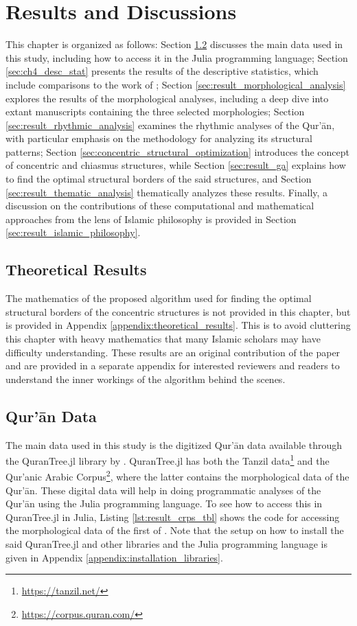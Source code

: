 \chapter{Results and Discussions}\label{ch:results}
This chapter is organized as follows: Section \ref{sec:result_data} discusses the main data used in this study, including how to access it in the Julia programming language; Section \ref{sec:ch4_desc_stat} presents the results of the descriptive statistics, which include comparisons to the work of \cite{sinai2020oqs}; Section \ref{sec:result_morphological_analysis} explores the results of the morphological analyses, including a deep dive into extant manuscripts containing the three selected morphologies; Section \ref{sec:result_rhythmic_analysis} examines the rhythmic analyses of the Qur'\=an, with particular emphasis on the methodology for analyzing its structural patterns; Section \ref{sec:concentric_structural_optimization} introduces the concept of concentric and chiasmus structures, while Section \ref{sec:result_ga} explains how to find the optimal structural borders of the said structures, and Section \ref{sec:result_thematic_analysis} thematically analyzes these results. Finally, a discussion on the contributions of these computational and mathematical approaches from the lens of Islamic philosophy is provided in Section \ref{sec:result_islamic_philosophy}.
\section{Theoretical Results}
The mathematics of the proposed algorithm used for finding the optimal structural borders of the concentric structures is not provided in this chapter, but is provided in Appendix \ref{appendix:theoretical_results}. This is to avoid cluttering this chapter with heavy mathematics that many Islamic scholars may have difficulty understanding. These results are an original contribution of the paper and are provided in a separate appendix for interested reviewers and readers to understand the inner workings of the algorithm behind the scenes.
\section{Qur'\=an Data}\label{sec:result_data}
The main data used in this study is the digitized Qur'\=an data available through the QuranTree.jl library by . QuranTree.jl has both the Tanzil data\footnote{\url{https://tanzil.net/}} and the Qur'anic Arabic Corpus\footnote{\url{https://corpus.quran.com/}}, where the latter contains the morphological data of the Qur'\=an. These digital data will help in doing programmatic analyses of the Qur'\=an using the Julia programming language. To see how to access this in QuranTree.jl in Julia, Listing \ref{lst:result_crps_tbl} shows the code for accessing the morphological data of the first   of  . Note that the setup on how to install the said QuranTree.jl and other libraries and the Julia programming language is given in Appendix \ref{appendix:installation_libraries}.

